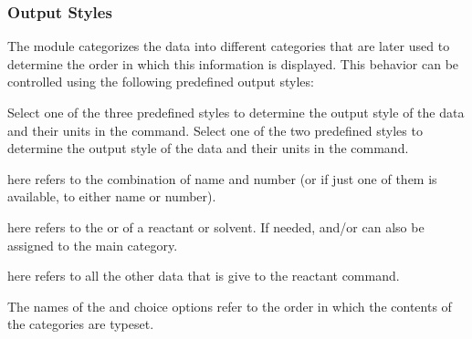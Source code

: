 \documentclass{chemmacros-manual}
\begin{document}
\subsubsection{Output Styles}\label{sec:output-styles}

The  module categorizes the data into different categories that are later used 
to determine the order in which this information is displayed. This behavior can be controlled using
the following predefined output styles:

\begin{options}
  Select one of the three predefined styles to determine the output style of the data and 
  their units in the  command.
  Select one of the two predefined styles to determine the output style of the data and 
  their units in the  command.
\end{options}

 here refers to the combination of name and number (or if just one of them is  available,
 to either name or number).
    
 here refers to the  or  of a reactant or solvent. If needed, 
  and/or  can also be assigned to the main category.
    
 here refers to all the other data that is give to the reactant command.

The names of the  and  choice options 
refer to the order in which the contents of the categories are typeset.

\begin{example}
  \par
  \par
  
  \par
\end{example}
\end{document}
